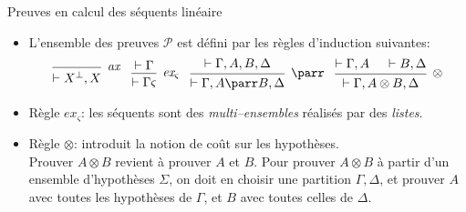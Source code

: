 \documentclass{beamer}
\newcommand*{\orth}{^\perp}
\newcommand*{\tensor}{\otimes}
\newcommand*{\hypv}[1]{\hypo{\vdash #1}}
\newcommand*{\axv}[1]{\infer{0}[\ensuremath{\mathit{ax}}]{\vdash #1}}
\newcommand*{\tensorv}[1]{\infer{2}[\ensuremath{\tensor}]{\vdash #1}}
\newcommand*{\parrv}[1]{\infer{1}[\ensuremath{\parr}]{\vdash #1}}
\newcommand*{\permv}[2]{\infer{1}[\ensuremath{\textit{ex}_{#1}}]{\vdash #2}}
\newcommand*{\permapp}[2]{#2 #1}
\newcommand*{\someperm}{\varsigma}
\newcommand*{\sequent}{\Gamma}
\newcommand*{\sequentbis}{\Delta}
\newcommand*{\proofs}{\ensuremath{\mathcal{P}}}
\begin{document}
\begin{frame}{Preuves en calcul des séquents linéaire}
    \begin{itemize}
        \item L'ensemble des preuves \proofs{} est défini par les règles d'induction suivantes:\pause
            \begin{equation*}
            \begin{prooftree}
              \axv{X\orth, X}
            \end{prooftree}
            \; \; \;
            \begin{prooftree}
              \hypv{\sequent}
              \permv{\someperm}{\permapp{\someperm}{\sequent}}
            \end{prooftree}
            \; \; \;
            \begin{prooftree}
              \hypv{\sequent, A, B, \sequentbis}
              \parrv{\sequent, A \parr B, \sequentbis}
            \end{prooftree}
            \; \; \;
            \begin{prooftree}
              \hypv{\sequent, A}
              \hypv{B, \sequentbis}
              \tensorv{\sequent, A \tensor B, \sequentbis}
            \end{prooftree}
            \end{equation*}
            \pause
        \item Règle $\textit{ex}_{\someperm}$: \pause les séquents sont des \textit{multi--ensembles} réalisés par des \textit{listes}.
            \pause
        \item Règle $\tensor$: introduit la notion de coût sur les hypothèses.\\
        \pause Prouver $A \tensor B$ revient à prouver $A$ et $B$. Pour prouver $A \tensor B$ à partir d'un ensemble d'hypothèses $\Sigma$, on doit en choisir une partition $\sequent, \sequentbis$, et prouver $A$ avec toutes les hypothèses de $\sequent$, et $B$ avec toutes celles de $\sequentbis$.
    \end{itemize}
\end{frame}
\end{document}
